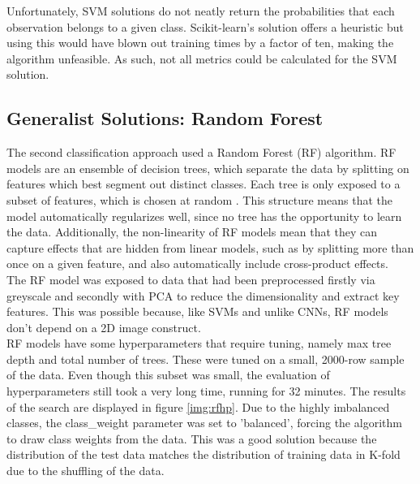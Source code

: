 \documentclass[12pt]{article}
\begin{document}
Unfortunately, SVM solutions do not neatly return the probabilities that each observation belongs to a given class. Scikit-learn's solution offers a heuristic but using this would have blown out training times by a factor of ten, making the algorithm unfeasible. As such, not all metrics could be calculated for the SVM solution.\\


\subsection{Generalist Solutions: Random Forest}
The second classification approach used a Random Forest (RF) algorithm. RF models are an ensemble of decision trees, which separate the data by splitting on features which best segment out distinct classes. Each tree is only exposed to a subset of features, which is chosen at random \citep{rfimages}. This structure means that the model automatically regularizes well, since no tree has the opportunity to learn the data. Additionally, the non-linearity of RF models mean that they can capture effects that are hidden from linear models, such as by splitting more than once on a given feature, and also automatically include cross-product effects. \\

The RF model was exposed to data that had been preprocessed firstly via greyscale and secondly with PCA to reduce the dimensionality and extract key features. This was possible because, like SVMs and unlike CNNs, RF models don't depend on a 2D image construct.\\

RF models have some hyperparameters that require tuning, namely max tree depth and total number of trees. These were tuned on a small, 2000-row sample of the data. Even though this subset was small, the evaluation of hyperparameters still took a very long time, running for 32 minutes. The results of the search are displayed in figure \ref{img:rfhp}.  Due to the highly imbalanced classes, the class\_weight parameter was set to 'balanced', forcing the algorithm to draw class weights from the data. This was a good solution because the distribution of the test data matches the distribution of training data in K-fold due to the shuffling of the data.\\
\end{document}
